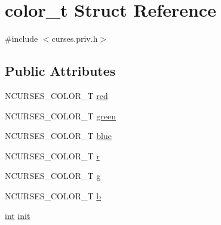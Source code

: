\hypertarget{structcolor__t}{\section{color\-\_\-t Struct Reference}
\label{structcolor__t}
}


{\ttfamily \#include $<$curses.\-priv.\-h$>$}

\subsection*{Public Attributes}
\begin{DoxyCompactItemize}
\item 
N\-C\-U\-R\-S\-E\-S\-\_\-\-C\-O\-L\-O\-R\-\_\-\-T \hyperlink{structcolor__t_a6f58df21ac1ed99e59d7afd8de05e062}{red}
\item 
N\-C\-U\-R\-S\-E\-S\-\_\-\-C\-O\-L\-O\-R\-\_\-\-T \hyperlink{structcolor__t_aa4210bb72e38bc6d7997eb8581901eff}{green}
\item 
N\-C\-U\-R\-S\-E\-S\-\_\-\-C\-O\-L\-O\-R\-\_\-\-T \hyperlink{structcolor__t_ab20dc19077d721888702d69473cd497b}{blue}
\item 
N\-C\-U\-R\-S\-E\-S\-\_\-\-C\-O\-L\-O\-R\-\_\-\-T \hyperlink{structcolor__t_aa92f8c6b3f25c127afcaee60fe292c41}{r}
\item 
N\-C\-U\-R\-S\-E\-S\-\_\-\-C\-O\-L\-O\-R\-\_\-\-T \hyperlink{structcolor__t_af312c600cc53f168993b945f9e899399}{g}
\item 
N\-C\-U\-R\-S\-E\-S\-\_\-\-C\-O\-L\-O\-R\-\_\-\-T \hyperlink{structcolor__t_a499ea342d902c7c8455ef00f8b42af5d}{b}
\item 
\hyperlink{term__entry_8h_ad65b480f8c8270356b45a9890f6499ae}{int} \hyperlink{structcolor__t_ab3f503ea9f8b4a26326e0ec326fbdea9}{init}
\end{DoxyCompactItemize}


